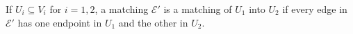 If $U_i \subseteq V_i$ for $i = 1, 2$, a matching $\mathcal{E}'$ is a matching of $U_1$ into $U_2$ if every edge in $\mathcal{E}'$ has one endpoint in $U_1$ and the other in $U_2$.